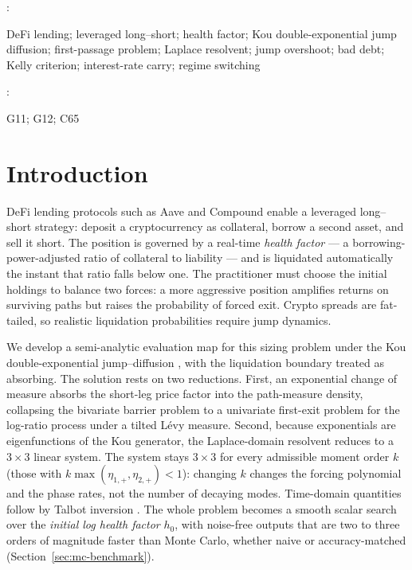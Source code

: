 \documentclass[11pt]{article}
\newenvironment{keywords}{%
  \par\addvspace{11pt}%
  \fontsize{9}{11}\selectfont
  \setlength{\leftskip}{2pc}%
  \setlength{\rightskip}{2pc plus 1fill}%
  \noindent{\itshape Keywords\/}: \ignorespaces
}{%
  \par\addvspace{26pt plus 4pt}%
}
\newenvironment{classcode}{%
  \par\addvspace{-9pt}%
  \fontsize{9}{11}\selectfont
  \setlength{\leftskip}{2pc}%
  \setlength{\rightskip}{2pc plus 1fill}%
  \noindent{\itshape JEL Classification\/}: \ignorespaces
}{%
  \par\addvspace{26pt plus 4pt}%
}
\theoremstyle{plain}
\theoremstyle{definition}
\theoremstyle{remark}
\begin{document}
\begin{keywords}
DeFi lending; leveraged long--short; health factor; Kou double-exponential jump diffusion; first-passage problem; Laplace resolvent; jump overshoot; bad debt; Kelly criterion; interest-rate carry; regime switching
\end{keywords}

\begin{classcode}
G11; G12; C65
\end{classcode}

\section{Introduction}

DeFi lending protocols such as Aave and Compound enable a leveraged long--short strategy: deposit a
cryptocurrency as collateral, borrow a second asset, and sell it short. The position is governed by a
real-time \emph{health factor} --- a borrowing-power-adjusted ratio of collateral to liability --- and
is liquidated automatically the instant that ratio falls below one. The practitioner must choose the
initial holdings to balance two forces: a more aggressive position amplifies returns on surviving
paths but raises the probability of forced exit. Crypto spreads are fat-tailed, so realistic
liquidation probabilities require jump dynamics.

We develop a semi-analytic evaluation map for this sizing problem under the Kou double-exponential
jump--diffusion \citep{Kou2002}, with the liquidation boundary treated as absorbing. The solution
rests on two reductions. First, an exponential change of measure absorbs the short-leg price factor
into the path-measure density, collapsing the bivariate barrier problem to a univariate first-exit
problem for the log-ratio process under a tilted L\'evy measure. Second, because exponentials are
eigenfunctions of the Kou generator, the Laplace-domain resolvent reduces to a $3\times3$ linear
system. The system stays $3\times3$ for every admissible moment order $k$ (those with
$k\max(\eta_{1,+},\eta_{2,+})<1$): changing $k$ changes the forcing polynomial and the phase rates, not the number of
decaying modes. Time-domain quantities follow by Talbot inversion \citep{Talbot1979}. The whole
problem becomes a smooth scalar search over the \emph{initial log health factor} $h_0$, with
noise-free outputs that are two to three orders of magnitude faster than Monte Carlo, whether
naive or accuracy-matched (Section~\ref{sec:mc-benchmark}).
\end{document}
